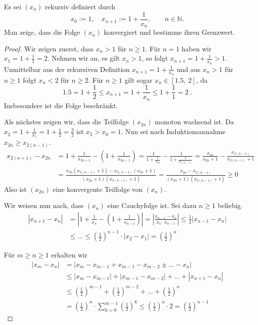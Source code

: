 \begin{aufgabe}
Es sei $(x_n)$ rekursiv definiert durch
\[
x_0 := 1, \quad x_{n+1} := 1 + \frac{1}{x_n}, \qquad n \in \mathbb N .
\]
Man zeige, dass die Folge $(x_n)$ konvergiert und bestimme ihren Grenzwert.
\end{aufgabe}
\begin{proof}
Wir zeigen zuerst, dass $x_n > 1$ für $n \geq 1$.
Für $n = 1$ haben wir $x_1 = 1 + \frac 1 1 = 2$.
Nehmen wir an, es gilt $x_n > 1$, so folgt $x_{n+1} = 1 + \frac{1}{x_n} > 1$.
Unmittelbar aus der rekursiven Definition $x_{n+1} = 1 + \frac{1}{x_n}$ und
aus $x_n > 1$ für $n \geq 1$ folgt $x_n < 2$ für $n \geq 2$.
Für $n \geq 1$ gilt sogar $x_n \in \left[ 1.5, \  2 \right]$, da
\[
1.5 = 1 + \frac 1 2 \leq x_{n+1} = 1 + \frac{1}{x_n} \leq 1 + \frac 1 1 = 2 \ .
\]
Insbesondere ist die Folge beschränkt.

Als nächstes zeigen wir, dass die Teilfolge $(x_{2n})$ monoton wachsend ist. Da 
$x_2 = 1 + \frac{1}{x_1} = 1 + \frac{1}{2} = \frac{3}{2}$ ist $x_2 > x_0 = 1$.
Nun sei nach Induktionsannahme $x_{2n} \geq x_{2(n-1)}$.
\begin{align*}
x_{2(n+1)} - x_{2n}
	&= 1 + \frac{1}{x_{2n+1}} - \left( 1 + \frac{1}{x_{2n-1}} \right)
	= \frac{1}{1 + \frac{1}{x_{2n}}} - \frac{1}{1 + \frac{1}{x_{2(n-1)}}}
	= \frac{x_{2n}}{x_{2n}+1} - \frac{x_{2(n-1)}}{x_{2(n-1)} + 1} \\
	&= \frac{ x_{2n} (x_{2(n-1)} + 1) - x_{2(n-1)} (x_{2n} + 1)}{(x_{2n}+1)(x_{2(n-1)}+1)}
	= \frac{x_{2n} - x_{2(n-1)}}{(x_{2n}+1)(x_{2(n-1)}+1)} \geq 0
\end{align*}
Also ist $(x_{2n})$ eine konvergente Teilfolge von $(x_n)$.

Wir weisen nun nach, dass $(x_n)$ eine Cauchyfolge ist. Sei dazu $n \geq 1$ beliebig.
\begin{align*}
| x_{n+1} - x_n | 
	&= \left| 1 + \frac{1}{x_n} - \left( 1 + \frac{1}{x_{n-1}} \right) \right|
	= \left| \frac{ x_{n-1} - x_n}{x_n \cdot x_{n-1}} \right|
	\leq \frac 1 2 | x_{n-1} - x_n | \\
	&\leq \ldots \leq \left( \frac 1 2 \right)^{n-1} \cdot |x_2 - x_1 |
	= \left( \frac 1 2 \right)^n
\end{align*}

Für $m \geq n \geq 1$ erhalten wir
\begin{align*}
| x_m - x_n | 
	&= | x_m - x_{m-1} + x_{m-1} - x_{m-2} \pm \ldots - x_n | \\
	&\leq |x_m - x_{m-1} | + | x_{m-1} - x_{m-2} | + \ldots + |x_{n+1} - x_n| \\
	&\leq \left( \frac 1 2 \right)^{m-1} + \left( \frac 1 2 \right)^{m-2} + \ldots
	+ \left( \frac 1 2 \right)^n \\
	&= \left( \frac 1 2 \right)^n \cdot \sum_{k=0}^{m-1} \left( \frac 1 2 \right)^k 
	\leq \left( \frac 1 2 \right)^n \cdot 2
	= \left( \frac 1 2 \right)^{n-1}
\end{align*}


\end{proof}
